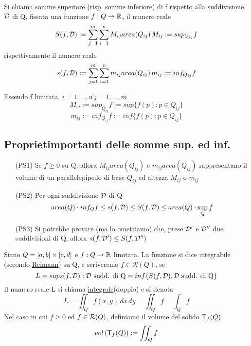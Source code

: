 \begin{definition}
  Si chiama \underline{somme superiore} (risp. \underline{somme inferiore}) di f rispetto alla suddivisione 
  $\mathcal{D}$ di Q, fissata una funzione $f:Q \to \mathbb{R}$, il numero reale
  $$S(f,\mathcal{D}):= \sum_{j=1}^{m}\sum_{i=1}^{n} M_{ij} area(Q_{ij}) \, M_{ij} := sup_{Q_{ij}}f$$
  rispettivamente il numero reale
  $$s(f,\mathcal{D}):= \sum_{j=1}^{m}\sum_{i=1}^{n} m_{ij} area(Q_{ij}) \, m_{ij} := inf_{Q_{ij}}f$$
\end{definition}
\begin{osservazione}
  Essendo f limitata, $i = 1,..., n \, j = 1,..., m$
  $$M_{ij} :=  sup_{Q_{ij}}f := sup\{f(p):p \in Q_{ij}\}$$
  $$m_{ij} :=  inf_{Q_{ij}}f := inf\{f(p):p \in Q_{ij}\}$$
\end{osservazione}
\subsection{Propriet\aca importanti delle somme sup. ed inf. }
\begin{itemize}
  \item[(PS1)] Se $f\geq 0$ su Q, allora $M_{ij}area(Q_{ij})$ e $m_{ij}area(Q_{ij})$ rappresentano
          il volume di un parallelepipedo di base $Q_{ij}$ ed altezza $M_{ij}$ o $m_{ij}$
  \item[(PS2)] Per ogni suddivisione $\mathcal{D}$ di Q
            $$area(Q)\cdot inf_{Q} f \leq s(f,\mathcal{D}) \leq S(f,\mathcal{D}) \leq area(Q) \cdot \sup_{Q} f$$
  \item[(PS3)] Si potrebbe provare (ma lo omettiamo) che, prese $\mathcal{D}'$ e $\mathcal{D}''$ due suddivisioni di Q, allora 
            $s(f,\mathcal{D}') \leq S(f,\mathcal{D}'')$
\end{itemize}
\begin{definition}
  Siano $Q = [a,b]\times[c,d]$ e $f : Q \to \mathbb{R}$ limitata. La funzione si dice integrabile (secondo \underline{Reimann}) su Q, e scriveremo
  $f\in \mathcal{R}(Q)$, se $$L = sup{s(f,\mathcal{D}): \mathcal{D} \text{ sudd. di Q}} = inf\{S(f,\mathcal{D}), \mathcal{D} \text{ sudd. di Q}\}$$
  Il numero reale L si chiama \underline{integrale}(doppio) e si denota
  $$L = \iint_{Q} f(x,y) \, dx \, dy = \iint_{Q} f = \int_{Q} f$$
  Nel caso in cui $f\geq 0$ ed $f \in \mathcal{R}(Q)$, definiamo il \underline{volume del solido $\mathsf{T}_{f}(Q)$}
  $$vol\left(\mathsf{T}_f(Q)\right):= \iint_{Q} f$$ 
\end{definition}

